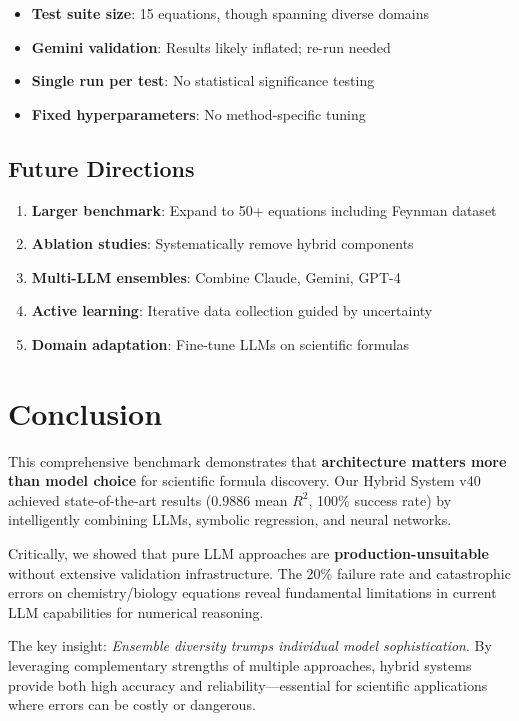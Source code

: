 \documentclass[11pt,a4paper]{article}
\begin{document}
\begin{itemize}
    \item \textbf{Test suite size}: 15 equations, though spanning diverse domains
    \item \textbf{Gemini validation}: Results likely inflated; re-run needed
    \item \textbf{Single run per test}: No statistical significance testing
    \item \textbf{Fixed hyperparameters}: No method-specific tuning
\end{itemize}

\subsection{Future Directions}

\begin{enumerate}
    \item \textbf{Larger benchmark}: Expand to 50+ equations including Feynman dataset
    \item \textbf{Ablation studies}: Systematically remove hybrid components
    \item \textbf{Multi-LLM ensembles}: Combine Claude, Gemini, GPT-4
    \item \textbf{Active learning}: Iterative data collection guided by uncertainty
    \item \textbf{Domain adaptation}: Fine-tune LLMs on scientific formulas
\end{enumerate}

\section{Conclusion}

This comprehensive benchmark demonstrates that \textbf{architecture matters more than model choice} for scientific formula discovery. Our Hybrid System v40 achieved state-of-the-art results (0.9886 mean $R^2$, 100\% success rate) by intelligently combining LLMs, symbolic regression, and neural networks.

Critically, we showed that pure LLM approaches are \textbf{production-unsuitable} without extensive validation infrastructure. The 20\% failure rate and catastrophic errors on chemistry/biology equations reveal fundamental limitations in current LLM capabilities for numerical reasoning.

The key insight: \textit{Ensemble diversity trumps individual model sophistication}. By leveraging complementary strengths of multiple approaches, hybrid systems provide both high accuracy and reliability—essential for scientific applications where errors can be costly or dangerous.
\end{document}
